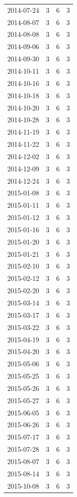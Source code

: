 \begin{tabular}{lrrr}
2014-07-24 & 3 & 6 & 3 \\
2014-08-07 & 3 & 6 & 3 \\
2014-08-08 & 3 & 6 & 3 \\
2014-09-06 & 3 & 6 & 3 \\
2014-09-30 & 3 & 6 & 3 \\
2014-10-11 & 3 & 6 & 3 \\
2014-10-16 & 3 & 6 & 3 \\
2014-10-18 & 3 & 6 & 3 \\
2014-10-20 & 3 & 6 & 3 \\
2014-10-28 & 3 & 6 & 3 \\
2014-11-19 & 3 & 6 & 3 \\
2014-11-22 & 3 & 6 & 3 \\
2014-12-02 & 3 & 6 & 3 \\
2014-12-09 & 3 & 6 & 3 \\
2014-12-24 & 3 & 6 & 3 \\
2015-01-08 & 3 & 6 & 3 \\
2015-01-11 & 3 & 6 & 3 \\
2015-01-12 & 3 & 6 & 3 \\
2015-01-16 & 3 & 6 & 3 \\
2015-01-20 & 3 & 6 & 3 \\
2015-01-21 & 3 & 6 & 3 \\
2015-02-10 & 3 & 6 & 3 \\
2015-02-12 & 3 & 6 & 3 \\
2015-02-20 & 3 & 6 & 3 \\
2015-03-14 & 3 & 6 & 3 \\
2015-03-17 & 3 & 6 & 3 \\
2015-03-22 & 3 & 6 & 3 \\
2015-04-19 & 3 & 6 & 3 \\
2015-04-20 & 3 & 6 & 3 \\
2015-05-06 & 3 & 6 & 3 \\
2015-05-25 & 3 & 6 & 3 \\
2015-05-26 & 3 & 6 & 3 \\
2015-05-27 & 3 & 6 & 3 \\
2015-06-05 & 3 & 6 & 3 \\
2015-06-26 & 3 & 6 & 3 \\
2015-07-17 & 3 & 6 & 3 \\
2015-07-28 & 3 & 6 & 3 \\
2015-08-07 & 3 & 6 & 3 \\
2015-08-14 & 3 & 6 & 3 \\
2015-10-08 & 3 & 6 & 3 \\

\end{tabular}
